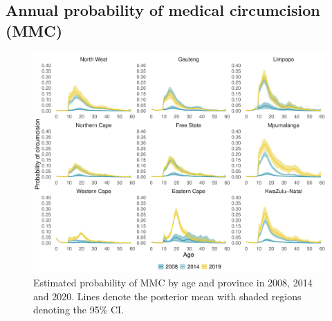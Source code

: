 \documentclass{article}
\begin{document}
\begin{appendix}

\subsection{Annual probability of medical circumcision (MMC)}


\begin{figure}[H]
	\centering
	\includegraphics[width = \linewidth]{Figures/suppmat/Rates/ProbabilityofMMC_SingleAge_Province.pdf}
	\caption{Estimated probability of MMC by age and province in 2008, 2014 and 2020. Lines denote the posterior mean with shaded regions denoting the 95\% CI.}
\end{figure}	



\end{appendix}
\end{document}
